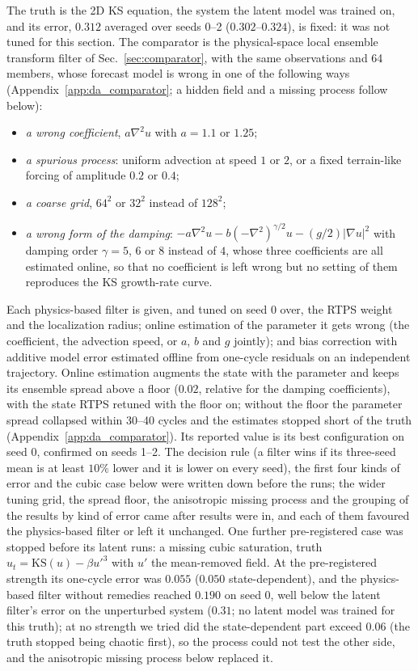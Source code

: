  The truth is the 2D KS equation, the system the latent
model was trained on, and its error, $0.312$ averaged over seeds 0--2
($0.302$--$0.324$), is fixed: it was not tuned for this section. The
comparator is the physical-space local ensemble transform filter of
Sec.~\ref{sec:comparator}, with the same observations and 64 members, whose forecast
model is wrong in one of the following ways (Appendix~\ref{app:da_comparator}; a hidden field and a
missing process follow below):
\begin{itemize}
\item \emph{a wrong coefficient}, $a\nabla^2u$ with $a=1.1$ or $1.25$;
\item \emph{a spurious process}: uniform advection at speed $1$ or $2$, or a
  fixed terrain-like forcing of amplitude $0.2$ or $0.4$;
\item \emph{a coarse grid}, $64^2$ or $32^2$ instead of $128^2$;
\item \emph{a wrong form of the damping}: $-a\nabla^2u - b(-\nabla^2)^{\gamma/2}u -
  (g/2)|\nabla u|^2$ with damping order $\gamma=5$, $6$ or $8$ instead of $4$, whose three
  coefficients are all estimated online, so that no coefficient is left
  wrong but no setting of them reproduces the KS growth-rate curve.
\end{itemize}
Each physics-based filter is given, and tuned on seed 0 over, the RTPS
weight and the localization radius; online estimation of the parameter
it gets wrong (the coefficient, the advection speed, or $a$, $b$ and $g$
jointly); and bias correction with additive model error estimated
offline from one-cycle residuals on an independent trajectory. Online
estimation augments the state with the parameter and keeps its ensemble
spread above a floor ($0.02$, relative for the damping coefficients),
with the state RTPS retuned with the floor on; without the floor the
parameter spread collapsed within 30--40 cycles and the estimates stopped
short of the truth (Appendix~\ref{app:da_comparator}). Its
reported value is its best configuration on seed 0, confirmed on seeds
1--2. The decision rule (a filter wins if its three-seed mean is at least
$10\%$ lower and it is lower on every seed), the first four kinds of error
and the cubic case below were written down before the runs; the wider tuning
grid, the spread floor, the anisotropic missing process and the grouping of
the results by kind of error came after results were in, and each of them
favoured the physics-based filter or left it unchanged. One further pre-registered case was stopped before its latent runs: a
missing cubic saturation, truth $u_t=\mathrm{KS}(u)-\beta u'^3$ with $u'$ the
mean-removed field. At the pre-registered strength its one-cycle error was
$0.055$ ($0.050$ state-dependent), and the physics-based filter without
remedies reached $0.190$ on seed 0, well below the latent filter's error on
the unperturbed system ($0.31$; no latent model was trained for this truth); at no strength we tried did the state-dependent part exceed $0.06$
(the truth stopped being chaotic first), so the process could not test the
other side, and the anisotropic missing process below replaced it.

